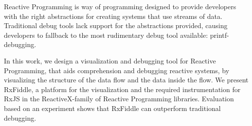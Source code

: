 Reactive Programming is way of programming designed to provide developers with the right abstractions for creating systems that use streams of data.
Traditional debug tools lack support for the abstractions provided, causing developers to fallback to the most rudimentary debug tool available: printf-debugging.

In this work, we design a visualization and debugging tool for Reactive Programming, that aids comprehension and debugging reactive systems, by visualizing the structure of the data flow and the data inside the flow.
We present RxFiddle, a platform for the visualization and the required instrumentation for RxJS in the ReactiveX-family of Reactive Programming libraries.
Evaluation based on an experiment shows that RxFiddle can outperform traditional debugging.
